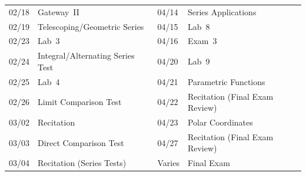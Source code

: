 \documentclass[11pt,letterpaper]{article}
\begin{document}
\begin{table}[!ht]
{\begin{tabular}{ll || ll}
	02/18 & Gateway~II & 04/14 & Series Applications \\
	02/19 & Telescoping/Geometric Series & 04/15 & Lab~8 \\
	02/23 & Lab~3 & 04/16 & Exam~3 \\
	02/24 & Integral/Alternating Series Test & 04/20 & Lab~9 \\
	02/25 & Lab~4 & 04/21 & Parametric Functions \\
	02/26 & Limit Comparison Test & 04/22 & Recitation (Final Exam Review) \\
	03/02 & Recitation & 04/23 & Polar Coordinates \\
	03/03 & Direct Comparison Test & 04/27 & Recitation (Final Exam Review) \\
	03/04 & Recitation (Series Tests) & Varies & Final Exam
        \end{tabular}
        }
        \end{table}
\end{document}
